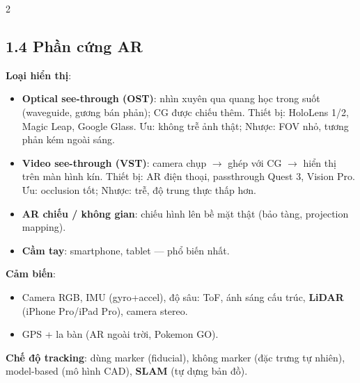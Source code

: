 \begin{paracol}{2}
\subsection*{1.4 Phần cứng AR}
\textbf{Loại hiển thị}:
\begin{itemize}[leftmargin=*,nosep]
  \item \textbf{Optical see-through (OST)}: nhìn xuyên qua quang học trong suốt (waveguide, gương bán phản); CG được chiếu thêm. Thiết bị: HoloLens 1/2, Magic Leap, Google Glass. Ưu: không trễ ảnh thật; Nhược: FOV nhỏ, tương phản kém ngoài sáng.
  \item \textbf{Video see-through (VST)}: camera chụp $\to$ ghép với CG $\to$ hiển thị trên màn hình kín. Thiết bị: AR điện thoại, passthrough Quest 3, Vision Pro. Ưu: occlusion tốt; Nhược: trễ, độ trung thực thấp hơn.
  \item \textbf{AR chiếu / không gian}: chiếu hình lên bề mặt thật (bảo tàng, projection mapping).
  \item \textbf{Cầm tay}: smartphone, tablet — phổ biến nhất.
\end{itemize}
\textbf{Cảm biến}:
\begin{itemize}[leftmargin=*,nosep]
  \item Camera RGB, IMU (gyro+accel), độ sâu: ToF, ánh sáng cấu trúc, \textbf{LiDAR} (iPhone Pro/iPad Pro), camera stereo.
  \item GPS + la bàn (AR ngoài trời, Pokemon GO).
\end{itemize}
\textbf{Chế độ tracking}: dùng marker (fiducial), không marker (đặc trưng tự nhiên), model-based (mô hình CAD), \textbf{SLAM} (tự dựng bản đồ).

\switchcolumn*


\end{paracol}
